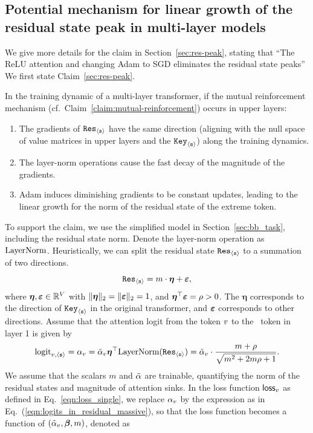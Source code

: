 \subsection{Potential mechanism for linear growth of the residual state peak in multi-layer models}
\label{appsec:theory-for-res}
We give more details for the claim in Section~\ref{sec:res-peak}, stating that ``The ReLU attention and changing Adam to SGD eliminates the residual state peaks'' We first state Claim~\ref{sec:res-peak}.
\begin{claim}\label{claim:res-peak}
In the training dynamic of a multi-layer transformer, if the mutual reinforcement mechanism (cf.\ Claim~\ref{claim:mutual-reinforcement}) occurs in upper layers:
\begin{enumerate}
    \item The gradients of ${\tt Res}_{\texttt{$\langle \texttt{s}\rangle$}}$ have the same direction (aligning with the null space of value matrices in upper layers and the ${\tt Key}_{\texttt{$\langle \texttt{s}\rangle$}}$) along the training dynamics.
    \item The layer-norm operations cause the fast decay of the magnitude of the gradients.
    \item Adam induces diminishing gradients to be constant updates, leading to the linear growth for the norm of the residual state of the extreme token.
\end{enumerate}
\end{claim}
To support the claim, we use the simplified model in Section~\ref{sec:bb_task}, including the residual state norm.
Denote the layer-norm operation as $\text{LayerNorm}$.
Heuristically, we can split the residual state ${\tt Res}_{\texttt{$\langle \texttt{s}\rangle$}}$ to a summation of two directions.
\[
{\tt Res}_{\texttt{$\langle \texttt{s}\rangle$}} = m \cdot \bm{\eta} + \bm{\varepsilon},
\]
where $\bm{\eta},\bm{\varepsilon} \in \mathbb{R}^V$ with $\|\bm{\eta}\|_2=\|\bm{\varepsilon}\|_2 = 1$, and $\bm{\eta}^\top \bm{\varepsilon} = \rho>0$. The $\bm{\eta}$ corresponds to the direction of ${\tt Key}_{\texttt{$\langle \texttt{s}\rangle$}}$ in the original transformer, and $\bm{\varepsilon}$ corresponds to other directions.
Assume that the attention logit from the token $v$ to the \bos~token in layer 1 is given by 
\begin{equation}\label{eqn:logits_in_residual_massive} \text{logit}_{v,\texttt{$\langle \texttt{s}\rangle$}}= \alpha_v = \Tilde{\alpha}_v \bm{\eta}^\top \text{LayerNorm}({\tt Res}_{\texttt{$\langle \texttt{s}\rangle$}})=\Tilde{\alpha}_v \cdot \frac{m+\rho}{\sqrt{m^2+2m\rho+1}}.\end{equation}
We assume that the scalars $m$ and $\Tilde{\alpha}$ are trainable, quantifying the norm of the residual states and magnitude of attention sinks. In the loss function $\mathsf{loss}_v$ as defined in Eq.~\eqref{eqn:loss_single}, we replace $\alpha_v$ by the expression as in Eq.~(\ref{eqn:logits_in_residual_massive}), so that the loss function becomes a function of $(\Tilde{\alpha}_v, \boldsymbol{\beta}, m)$, denoted as
